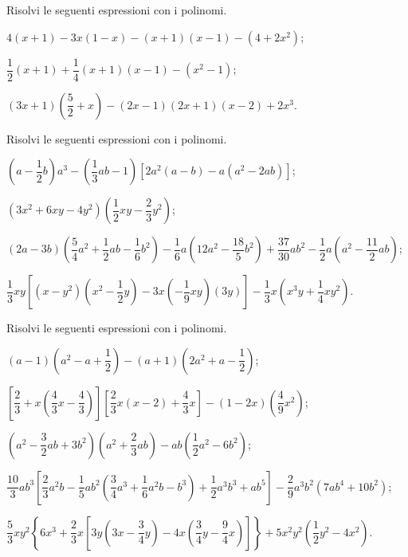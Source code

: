 \begin{esercizio}
\label{ese:11.48}
Risolvi le seguenti espressioni con i polinomi.
 \begin{enumeratea}
 \item $4(x+1)-3x(1-x)-(x+1)(x-1)-\left(4+2x^{2}\right)$;
 \item $\dfrac{1}{2}(x+1)+\dfrac{1}{4}(x+1)(x-1)-\left(x^{2}-1\right)$;
 \item $(3x+1)\left(\dfrac{5}{2}+x\right)-(2x-1)(2x+1)(x-2)+2x^{3}$.
 \end{enumeratea}
\end{esercizio}

\begin{esercizio}[\Ast]
\label{ese:11.49}
Risolvi le seguenti espressioni con i polinomi.
 \begin{enumeratea}
 \item $\left(a-\dfrac{1}{2}b\right)a^{3}-\left(\dfrac{1}{3}{ab}-1\right)\left[2a^{2}(a-b)-a\left(a^{2}-2{ab}\right)\right]$;
 \item $\left(3x^2+6xy-4y^2\right)\left(\dfrac{1}{2}xy-\dfrac{2}{3}y^2\right)$;
 \item $(2a-3b)\left(\dfrac{5}{4}a^{2}+\dfrac{1}{2}{ab}-\dfrac{1}{6}b^{2}\right)-\dfrac{1}{6}a\left(12a^{2}-\dfrac{18}{5}b^{2}\right)+\dfrac{37}{30}ab^{2}-\dfrac{1}{2}a\left(a^{2}-\dfrac{11}{2}{ab}\right)$;
 \item $\dfrac{1}{3}xy\left[\left(x-y^{2}\right)\left(x^{2}-\dfrac{1}{2}y\right)-3x\left(-{\dfrac{1}{9}xy}\right)\left(3y\right)\right]-\dfrac{1}{3}x\left(x^{3}y+\dfrac{1}{4}xy^{2}\right)$.
 \end{enumeratea}
\end{esercizio}

\begin{esercizio}[\Ast]
\label{ese:11.50}
Risolvi le seguenti espressioni con i polinomi.
 \begin{enumeratea}
 \item $(a-1)\left(a^{2}-a+\dfrac{1}{2}\right)-(a+1)\left(2a^{2}+a-\dfrac{1}{2}\right)$;
 \item $\left[\dfrac{2}{3}+x\left(\dfrac{4}{3}x-\dfrac{4}{3}\right)\right]\left[\dfrac{2}{3}x(x-2)+\dfrac{4}{3}x\right]-(1-2x)\left(\dfrac{4}{9}x^{2}\right)$;
 \item $\left(a^2-\dfrac{3}{2}ab+3b^2\right)\left(a^2+\dfrac{2}{3}ab\right)-ab\left(\dfrac{1}{2}a^{2}-6b^{2}\right)$;
 \item $\dfrac{10}{3}ab^{3}\left[\dfrac{2}{3}a^{2}b-\dfrac{1}{5}ab^{2}\left(\dfrac{3}{4}a^{3}+\dfrac{1}{6}a^{2}b-b^{3}\right)+\dfrac{1}{2}a^{3}b^{3}+ab^{5}\right]-\dfrac{2}{9}a^{3}b^{2}\left(7ab^{4}+10b^{2}\right)$;
 \item $\dfrac{5}{3}xy^{2}\left\lbrace 6x^{3}+\dfrac{2}{3}x\left[3y\left(3x-\dfrac{3}{4}y\right)-4x\left(\dfrac{3}{4}y-\dfrac{9}{4}x\right)\right]\right\rbrace+5x^{2}y^{2} \left(\dfrac{1}{2}y^{2}-4x^{2}\right)$.
 \end{enumeratea}
\end{esercizio}

